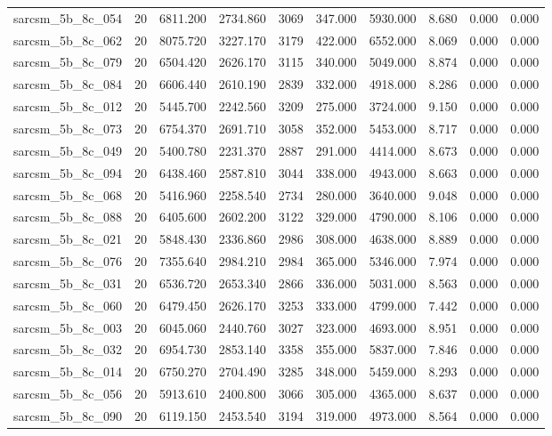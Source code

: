 \begin{tabular}{lrrrrrrrrr}
sarcsm\_5b\_8c\_054 & 20 & 6811.200 & 2734.860 & 3069 & 347.000 & 5930.000 & 8.680 & 0.000 & 0.000 \\
sarcsm\_5b\_8c\_062 & 20 & 8075.720 & 3227.170 & 3179 & 422.000 & 6552.000 & 8.069 & 0.000 & 0.000 \\
sarcsm\_5b\_8c\_079 & 20 & 6504.420 & 2626.170 & 3115 & 340.000 & 5049.000 & 8.874 & 0.000 & 0.000 \\
sarcsm\_5b\_8c\_084 & 20 & 6606.440 & 2610.190 & 2839 & 332.000 & 4918.000 & 8.286 & 0.000 & 0.000 \\
sarcsm\_5b\_8c\_012 & 20 & 5445.700 & 2242.560 & 3209 & 275.000 & 3724.000 & 9.150 & 0.000 & 0.000 \\
sarcsm\_5b\_8c\_073 & 20 & 6754.370 & 2691.710 & 3058 & 352.000 & 5453.000 & 8.717 & 0.000 & 0.000 \\
sarcsm\_5b\_8c\_049 & 20 & 5400.780 & 2231.370 & 2887 & 291.000 & 4414.000 & 8.673 & 0.000 & 0.000 \\
sarcsm\_5b\_8c\_094 & 20 & 6438.460 & 2587.810 & 3044 & 338.000 & 4943.000 & 8.663 & 0.000 & 0.000 \\
sarcsm\_5b\_8c\_068 & 20 & 5416.960 & 2258.540 & 2734 & 280.000 & 3640.000 & 9.048 & 0.000 & 0.000 \\
sarcsm\_5b\_8c\_088 & 20 & 6405.600 & 2602.200 & 3122 & 329.000 & 4790.000 & 8.106 & 0.000 & 0.000 \\
sarcsm\_5b\_8c\_021 & 20 & 5848.430 & 2336.860 & 2986 & 308.000 & 4638.000 & 8.889 & 0.000 & 0.000 \\
sarcsm\_5b\_8c\_076 & 20 & 7355.640 & 2984.210 & 2984 & 365.000 & 5346.000 & 7.974 & 0.000 & 0.000 \\
sarcsm\_5b\_8c\_031 & 20 & 6536.720 & 2653.340 & 2866 & 336.000 & 5031.000 & 8.563 & 0.000 & 0.000 \\
sarcsm\_5b\_8c\_060 & 20 & 6479.450 & 2626.170 & 3253 & 333.000 & 4799.000 & 7.442 & 0.000 & 0.000 \\
sarcsm\_5b\_8c\_003 & 20 & 6045.060 & 2440.760 & 3027 & 323.000 & 4693.000 & 8.951 & 0.000 & 0.000 \\
sarcsm\_5b\_8c\_032 & 20 & 6954.730 & 2853.140 & 3358 & 355.000 & 5837.000 & 7.846 & 0.000 & 0.000 \\
sarcsm\_5b\_8c\_014 & 20 & 6750.270 & 2704.490 & 3285 & 348.000 & 5459.000 & 8.293 & 0.000 & 0.000 \\
sarcsm\_5b\_8c\_056 & 20 & 5913.610 & 2400.800 & 3066 & 305.000 & 4365.000 & 8.637 & 0.000 & 0.000 \\
sarcsm\_5b\_8c\_090 & 20 & 6119.150 & 2453.540 & 3194 & 319.000 & 4973.000 & 8.564 & 0.000 & 0.000 \\

\end{tabular}
